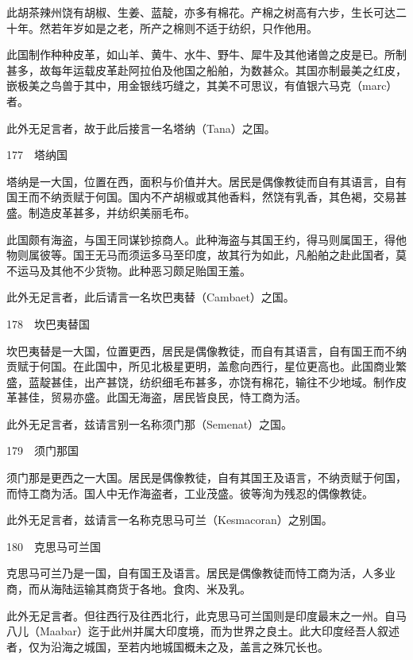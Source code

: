 \documentclass[12pt,UTF8]{ctexbook}
\begin{document}
此胡茶辣州饶有胡椒、生姜、蓝靛，亦多有棉花。产棉之树高有六步，生长可达二十年。然若年岁如是之老，所产之棉则不适于纺织，只作他用。

此国制作种种皮革，如山羊、黄牛、水牛、野牛、犀牛及其他诸兽之皮是已。所制甚多，故每年运载皮革赴阿拉伯及他国之船舶，为数甚众。其国亦制最美之红皮，嵌极美之鸟兽于其中，用金银线巧缝之，其美不可思议，有值银六马克（marc）者。

此外无足言者，故于此后接言一名塔纳（Tana）之国。





177　塔纳国

塔纳是一大国，位置在西，面积与价值并大。居民是偶像教徒而自有其语言，自有国王而不纳贡赋于何国。国内不产胡椒或其他香料，然饶有乳香，其色褐，交易甚盛。制造皮革甚多，并纺织美丽毛布。

此国颇有海盗，与国王同谋钞掠商人。此种海盗与其国王约，得马则属国王，得他物则属彼等。国王无马而须运多马至印度，故其行为如此，凡船舶之赴此国者，莫不运马及其他不少货物。此种恶习颇足贻国王羞。

此外无足言者，此后请言一名坎巴夷替（Cambaet）之国。





178　坎巴夷替国

坎巴夷替是一大国，位置更西，居民是偶像教徒，而自有其语言，自有国王而不纳贡赋于何国。在此国中，所见北极星更明，盖愈向西行，星位更高也。此国商业繁盛，蓝靛甚佳，出产甚饶，纺织细毛布甚多，亦饶有棉花，输往不少地域。制作皮革甚佳，贸易亦盛。此国无海盗，居民皆良民，恃工商为活。

此外无足言者，兹请言别一名称须门那（Semenat）之国。





179　须门那国

须门那是更西之一大国。居民是偶像教徒，自有其国王及语言，不纳贡赋于何国，而恃工商为活。国人中无作海盗者，工业茂盛。彼等洵为残忍的偶像教徒。

此外无足言者，兹请言一名称克思马可兰（Kesmacoran）之别国。





180　克思马可兰国

克思马可兰乃是一国，自有国王及语言。居民是偶像教徒而恃工商为活，人多业商，而从海陆运输其商货于各地。食肉、米及乳。

此外无足言者。但往西行及往西北行，此克思马可兰国则是印度最末之一州。自马八儿（Maabar）迄于此州并属大印度境，而为世界之良土。此大印度经吾人叙述者，仅为沿海之城国，至若内地城国概未之及，盖言之殊冗长也。
\end{document}
